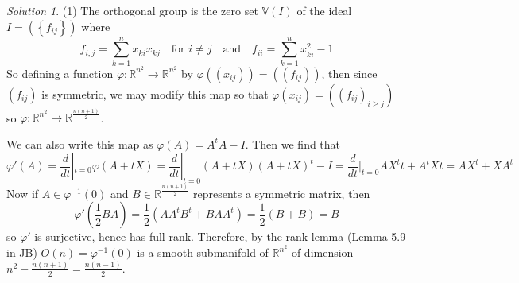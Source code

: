 \documentclass[reqno]{amsart}
\theoremstyle{definition}
\theoremstyle{remark}
\newtheorem*{solution}{Solution}
\begin{document}
\begin{solution}
    (1) The orthogonal group is the zero set
    $\mathbb{V} (I)$ of the ideal
    $I = \left( \left\{ f_{ij} \right\}  \right) $ where
    \[
    f_{i,j} = \sum_{k=1}^{n} x_{ki} x_{kj}
    \quad \text{for }i \neq j \quad \text{and} \quad
    f_{ii} = \sum_{k=1}^{n} x_{ki}^2 -1
    \] 
    So defining a function
    $\varphi \colon 
    \mathbb{R}^{n^2} \to 
    \mathbb{R}^{n^2}$ by
    $\varphi \left( \left( x_{ij} \right)  \right) 
    = \left( \left( f_{ij} \right)  \right) $, then
    since $ \left( f_{ij} \right) $ is symmetric,
    we may modify this map so that
    $\varphi \left( x_{ij} \right) 
    = \left( \left( f_{ij} \right)_{i\ge j} \right) $ so
    $\varphi  \colon \mathbb{R}^{n^2} \to 
    \mathbb{R}^{\frac{n (n+1)}{2}}$.

    We can also write this map as
    $\varphi (A) = A^{t}A - I$.
    Then we find that
     \[
    \varphi '(A) = 
    \frac{d}{dt}|_{t=0} \varphi (A+ tX)
    = \frac{d}{dt}|_{t=0}
    \left( A+tX \right) \left( A+tX \right)^{t} - I
    =\frac{d}{dt}|_{t=0} A X^{t} t + A^{t}Xt
    = AX^{t} + XA^{t}
    \] 
    Now if
    $A \in \varphi^{-1}(0)$ and
    $B \in \mathbb{R}^{\frac{n(n+1)}{2}}$ represents a symmetric
    matrix, then
     \[
    \varphi '(\frac{1}{2}BA) = 
    \frac{1}{2} \left( A A^{t}B^{t} +
    BA A^{t} \right) 
    = \frac{1}{2} (B+B) = B
    \] 
    so $\varphi '$ is surjective, hence has full rank.
    Therefore, by the rank lemma (Lemma 5.9 in JB)
    $O(n) = \varphi^{-1}(0)$ is a smooth submanifold of
    $\mathbb{R}^{n^2}$ of dimension
    $n^2 - \frac{n(n+1)}{2}
    = \frac{n(n-1)}{2}$.
\end{solution}
\end{document}
